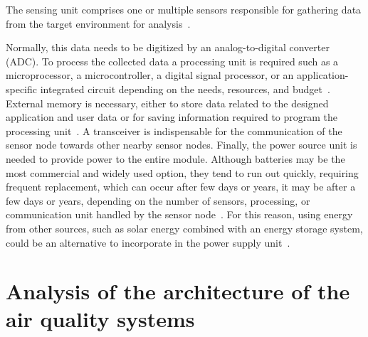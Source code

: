 \documentclass[10pt]{../style_src/imeko_acta}
\begin{document}
The sensing unit comprises one or multiple sensors responsible for gathering data from the target environment for analysis~\cite{1197877, 6949922,9538816}.

Normally, this data needs to be digitized by an analog-to-digital converter (ADC). To process the collected data a processing unit is required such as a microprocessor, a microcontroller, a digital signal processor, or an application-specific integrated circuit depending on the needs, resources, and budget~\cite{6861346, 6949922}. External memory is necessary, either to store data related to the designed application and user data or for saving information required to program the processing unit~\cite{6949922}. A transceiver is indispensable for the communication of the sensor node towards other nearby sensor nodes. Finally, the power source unit is needed to provide power to the entire module.
Although batteries may be the most commercial and widely used option, they tend to run out quickly, requiring frequent replacement, which can occur after few days or years, it may be after a few days or years, depending on the number of sensors, processing, or communication unit handled by the sensor node~\cite{5339410}. For this reason, using energy from other sources, such as solar energy combined with an energy storage system, could be an alternative to incorporate in the power supply unit~\cite{5339410}.	

\section{Analysis of the architecture of the air quality systems}
\end{document}
